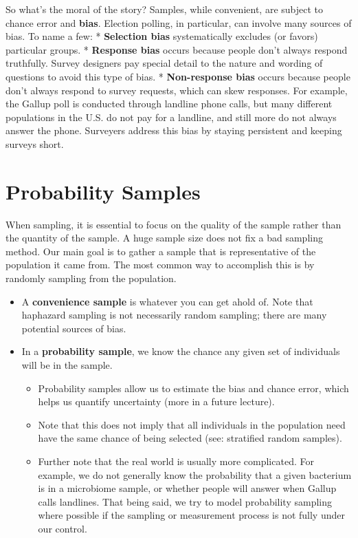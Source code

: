 \documentclass[
  letterpaper,
  DIV=11,
  numbers=noendperiod]{scrreprt}
\providecommand{\tightlist}{%
  \setlength{\itemsep}{0pt}\setlength{\parskip}{0pt}}\usepackage{longtable,booktabs,array}
\begin{document}
So what's the moral of the story? Samples, while convenient, are subject
to chance error and \textbf{bias}. Election polling, in particular, can
involve many sources of bias. To name a few: * \textbf{Selection bias}
systematically excludes (or favors) particular groups. *
\textbf{Response bias} occurs because people don't always respond
truthfully. Survey designers pay special detail to the nature and
wording of questions to avoid this type of bias. * \textbf{Non-response
bias} occurs because people don't always respond to survey requests,
which can skew responses. For example, the Gallup poll is conducted
through landline phone calls, but many different populations in the U.S.
do not pay for a landline, and still more do not always answer the
phone. Surveyers address this bias by staying persistent and keeping
surveys short.

\hypertarget{probability-samples}{%
\section{Probability Samples}\label{probability-samples}}

When sampling, it is essential to focus on the quality of the sample
rather than the quantity of the sample. A huge sample size does not fix
a bad sampling method. Our main goal is to gather a sample that is
representative of the population it came from. The most common way to
accomplish this is by randomly sampling from the population.

\begin{itemize}
\tightlist
\item
  A \textbf{convenience sample} is whatever you can get ahold of. Note
  that haphazard sampling is not necessarily random sampling; there are
  many potential sources of bias.
\item
  In a \textbf{probability sample}, we know the chance any given set of
  individuals will be in the sample.

  \begin{itemize}
  \tightlist
  \item
    Probability samples allow us to estimate the bias and chance error,
    which helps us quantify uncertainty (more in a future lecture).
  \item
    Note that this does not imply that all individuals in the population
    need have the same chance of being selected (see: stratified random
    samples).
  \item
    Further note that the real world is usually more complicated. For
    example, we do not generally know the probability that a given
    bacterium is in a microbiome sample, or whether people will answer
    when Gallup calls landlines. That being said, we try to model
    probability sampling where possible if the sampling or measurement
    process is not fully under our control.
  \end{itemize}
\end{itemize}
\end{document}
